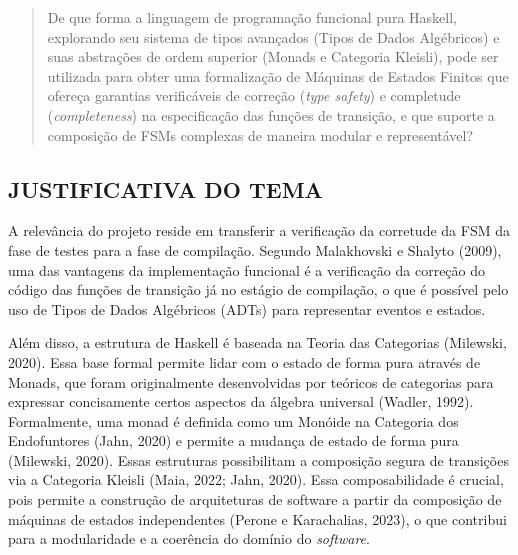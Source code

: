 \documentclass[12pt,a4paper]{article}
\begin{document}
\begin{quote}
   De que forma a linguagem de programação funcional pura Haskell, explorando seu sistema de tipos avançados (Tipos de Dados Algébricos) e suas abstrações de ordem superior (Monads e Categoria Kleisli), pode ser utilizada para obter uma formalização de Máquinas de Estados Finitos que ofereça garantias verificáveis de correção (\textit{type safety}) e completude (\textit{completeness}) na especificação das funções de transição, e que suporte a composição de  FSMs complexas  de maneira modular e representável? 
\end{quote}

\subsection{JUSTIFICATIVA DO TEMA}

A relevância do projeto reside em transferir a verificação da corretude da FSM da fase de testes para a fase de compilação. Segundo Malakhovski e Shalyto (2009), uma das vantagens da implementação funcional é a verificação da correção do código das funções de transição já no estágio de compilação, o que é possível pelo uso de Tipos de Dados Algébricos (ADTs) para representar eventos e estados.

Além disso, a estrutura de Haskell é baseada na Teoria das Categorias (Milewski, 2020). Essa base formal permite lidar com o estado de forma pura através de Monads, que foram originalmente desenvolvidas por teóricos de categorias para expressar concisamente certos aspectos da álgebra universal (Wadler, 1992). Formalmente, uma monad é definida como um Monóide na Categoria dos Endofuntores (Jahn, 2020) e permite a mudança de estado de forma pura (Milewski, 2020). Essas estruturas possibilitam a composição segura de transições via a Categoria Kleisli (Maia, 2022; Jahn, 2020). Essa composabilidade é crucial, pois permite a construção de arquiteturas de software a partir da composição de máquinas de estados independentes (Perone e Karachalias, 2023), o que contribui para a modularidade e a coerência do domínio do \textit{software}.
\end{document}
